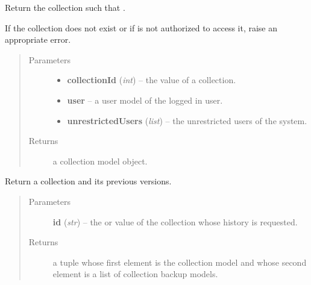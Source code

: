 \documentclass[letterpaper,10pt,english]{sphinxmanual}
\begin{document}
\begin{fulllineitems}
\label{api:onlinelinguisticdatabase.controllers.oldcollections.getCollection}
Return the collection such that .

If the collection does not exist or if  is not authorized to access
it, raise an appropriate error.
\begin{quote}\begin{description}
\item[{Parameters}] \leavevmode\begin{itemize}
\item {} 
\textbf{collectionId} (\emph{int}) -- the  value of a collection.

\item {} 
\textbf{user} -- a user model of the logged in user.

\item {} 
\textbf{unrestrictedUsers} (\emph{list}) -- the unrestricted users of the system.

\end{itemize}

\item[{Returns}] \leavevmode
a collection model object.

\end{description}\end{quote}

\end{fulllineitems}


\begin{fulllineitems}
\label{api:onlinelinguisticdatabase.controllers.oldcollections.getCollectionAndPreviousVersions}
Return a collection and its previous versions.
\begin{quote}\begin{description}
\item[{Parameters}] \leavevmode
\textbf{id} (\emph{str}) -- the  or  value of the collection whose history
is requested.

\item[{Returns}] \leavevmode
a tuple whose first element is the collection model and whose
second element is a list of collection backup models.

\end{description}\end{quote}

\end{fulllineitems}
\end{document}
